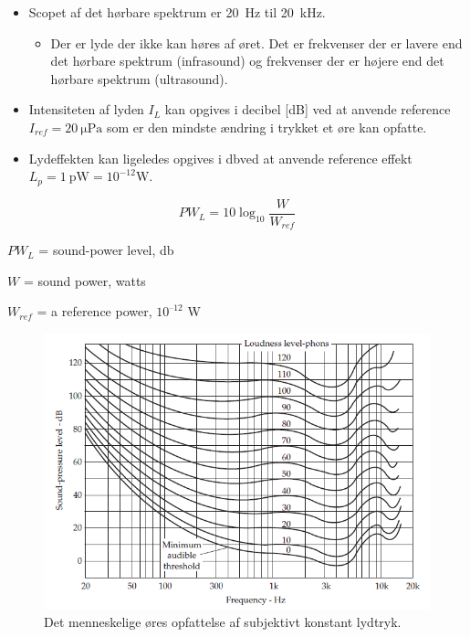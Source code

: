 \begin{itemize}
	\item Scopet af det hørbare spektrum er \SI{20}{\hertz} til \SI{20}{\kilo\hertz}.
	\begin{itemize}
		\item Der er lyde der ikke kan høres af øret. Det er frekvenser der er lavere end det hørbare spektrum (infrasound) og frekvenser der er højere end det hørbare spektrum (ultrasound).
	\end{itemize}
	\item Intensiteten af lyden $I_L$ kan opgives i decibel [dB] ved at anvende reference $I_{ref} = \SI{20}{\micro\pascal}$ som er den mindste ændring i trykket et øre kan opfatte.
	\item Lydeffekten kan ligeledes opgives i \si{\decibel}ved at anvende reference effekt $L_p = \SI{1}{\pico\watt} = 10^{-12} \si{\watt}$.
\end{itemize}

\begin{equation}\label{eq:decibel}
PW_L = 10\log_{10}\frac{W}{W_{ref}}
\end{equation}

\begin{description}
	\item $PW_L$ = sound-power level, \si{\decibel}
	\item $W$ = sound power, watts
	\item $W_{ref}$ = a reference power, $10^{–12}$ \si{\watt}
\end{description}

\begin{figure} [H]
	\centering
	\includegraphics[width=\linewidth]{graphics/8.png}
	\caption{Det menneskelige øres opfattelse af subjektivt konstant lydtryk.}
	\label{fig:8}
\end{figure}

